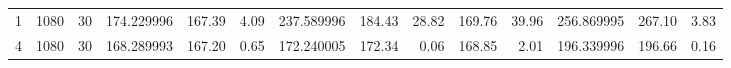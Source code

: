 \begin{tabular}{rrrrrrrrrrrrrr}
     1 &  1080 &    30 &    174.229996 &     167.39 &            4.09 &     237.589996 &      184.43 &                28.82 &         169.76 &                   39.96 &    256.869995 &     267.10 &            3.83 \\
     4 &  1080 &    30 &    168.289993 &     167.20 &            0.65 &     172.240005 &      172.34 &                 0.06 &         168.85 &                    2.01 &    196.339996 &     196.66 &            0.16 \\
\bottomrule
\end{tabular}
